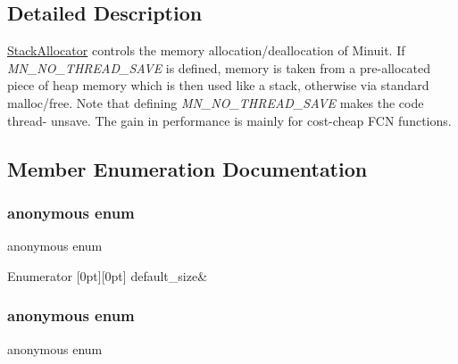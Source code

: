 \subsection{Detailed Description}
\mbox{\hyperlink{classROOT_1_1Minuit2_1_1StackAllocator}{Stack\+Allocator}} controls the memory allocation/deallocation of Minuit. If {\itshape M\+N\+\_\+\+N\+O\+\_\+\+T\+H\+R\+E\+A\+D\+\_\+\+S\+A\+VE} is defined, memory is taken from a pre-\/allocated piece of heap memory which is then used like a stack, otherwise via standard malloc/free. Note that defining {\itshape M\+N\+\_\+\+N\+O\+\_\+\+T\+H\+R\+E\+A\+D\+\_\+\+S\+A\+VE} makes the code thread-\/ unsave. The gain in performance is mainly for cost-\/cheap F\+CN functions. 

\subsection{Member Enumeration Documentation}
\mbox{\label{classROOT_1_1Minuit2_1_1StackAllocator_a15e330c0474ef3075767d4e5c2e74d27}} 
\subsubsection{\texorpdfstring{anonymous enum}{anonymous enum}}
{\footnotesize\ttfamily anonymous enum}

\begin{DoxyEnumFields}{Enumerator}
[0pt][0pt]{}\mbox{\label{classROOT_1_1Minuit2_1_1StackAllocator_a15e330c0474ef3075767d4e5c2e74d27a308d739070cf62de267a1793a45142e8}} 
default\+\_\+size&\\
\hline

\end{DoxyEnumFields}
\mbox{\label{classROOT_1_1Minuit2_1_1StackAllocator_a4f1aad4338e435243f6ab52ce05fbbd4}} 
\subsubsection{\texorpdfstring{anonymous enum}{anonymous enum}}
{\footnotesize\ttfamily anonymous enum}

